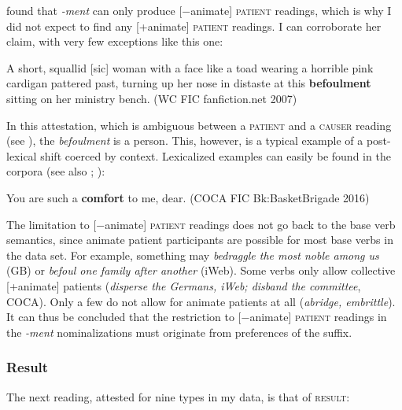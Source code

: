 \citet{Lieber.2016} found that \textit{-ment} can only produce [−animate] \textsc{patient} readings, which is why I did not expect to find any [+animate] \textsc{patient} readings. I can corroborate her claim, with very few exceptions like this one: 

\begin{exe}
  \ex \label{ex:cos.ro3} A short, squallid [sic] woman with a face like a toad wearing a horrible pink cardigan pattered past, turning up her nose in distaste at this \textbf{befoulment} sitting on her ministry bench. {\small(\acs{WC} FIC fanfiction.net 2007)}
\end{exe}

\noindent In this attestation, which is ambiguous between a \textsc{patient} and a \textsc{causer} reading (see ), the \textit{befoulment} is a person. This, however, is a typical example of a post-lexical shift coerced by context. Lexicalized examples can easily be found in the corpora (see also ; \citealt{Loebner.2008}): 

\begin{exe}
	\ex You are such a \textbf{comfort} to me, dear. {\small(\acs{COCA} FIC Bk:BasketBrigade 2016)}
\end{exe}

\noindent The limitation to [−animate] \textsc{patient} readings does not go back to the base verb semantics, since animate patient participants are possible for most base verbs in the data set. For example, something may \textit{bedraggle the most noble among us} (\acs{GB}) or \textit{befoul one family after another} (\acs{iWeb}). Some verbs only allow collective [+animate] patients (\textit{disperse the Germans, \acs{iWeb}; disband the committee}, \acs{COCA}). Only a few do not allow for animate patients at all (\textit{abridge, embrittle}). 
It can thus be concluded that the restriction to [−animate] \textsc{patient} readings in the \mbox{\textit{-ment}} nominalizations must originate from preferences of the suffix. 

\subsubsection{Result} 
\label{sec:cos-output-survey-result}
The next reading, attested for nine types in my data, is that of \textsc{result}:

